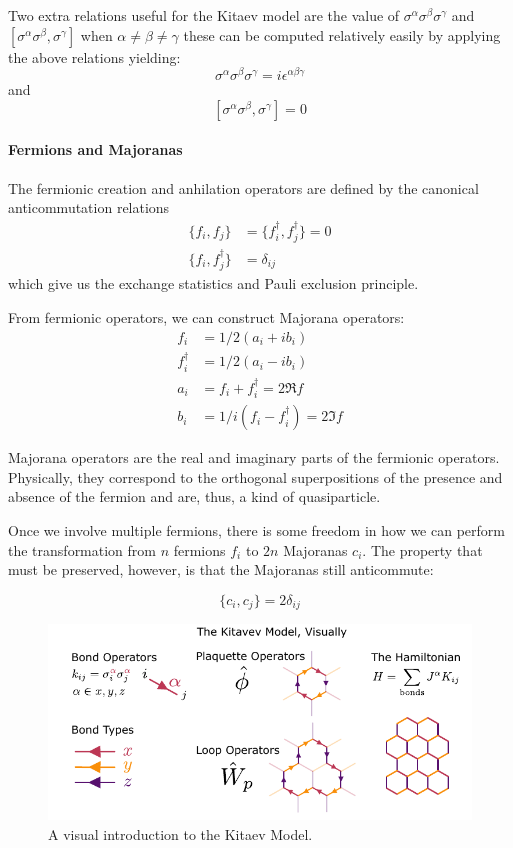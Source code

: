 Two extra relations useful for the Kitaev model are the value of \(\sigma^\alpha \sigma^\beta \sigma^\gamma\) and \([\sigma^\alpha \sigma^\beta, \sigma^\gamma]\) when \(\alpha \neq \beta \neq \gamma\) these can be computed relatively easily by applying the above relations yielding: \[\sigma^\alpha \sigma^\beta \sigma^\gamma = i \epsilon^{\alpha\beta\gamma}\] and \[[\sigma^\alpha \sigma^\beta, \sigma^\gamma] = 0\]

\hypertarget{fermions-and-majoranas}{%
\paragraph{Fermions and Majoranas}\label{fermions-and-majoranas}}

The fermionic creation and anhilation operators are defined by the canonical anticommutation relations \[\begin{aligned}
\{f_i, f_j\} &= \{f^\dagger_i, f^\dagger_j\} = 0\\
\{f_i, f^\dagger_j\} &= \delta_{ij}
\end{aligned}\] which give us the exchange statistics and Pauli exclusion principle.

From fermionic operators, we can construct Majorana operators: \[\begin{aligned}
f_i         &= 1/2 (a_i + ib_i)\\
f^\dagger_i &= 1/2(a_i - ib_i)\\
a_i         &= f_i + f^\dagger_i = 2\Re f\\
b_i         &= 1/i(f_i - f^\dagger_i) = 2\Im f 
\end{aligned}\]

Majorana operators are the real and imaginary parts of the fermionic operators. Physically, they correspond to the orthogonal superpositions of the presence and absence of the fermion and are, thus, a kind of quasiparticle.

Once we involve multiple fermions, there is some freedom in how we can perform the transformation from \(n\) fermions \(f_i\) to \(2n\) Majoranas \(c_i\). The property that must be preserved, however, is that the Majoranas still anticommute:

\[ \{c_i, c_j\} = 2\delta_{ij}\]

\begin{figure}
\hypertarget{fig:visual_kitaev_1}{%
\centering
\includegraphics[width=1\textwidth,height=\textheight]{figure_code/amk_chapter/visual_kitaev_1}
\caption[A Visual Intro to the Kitaev Model]{A visual introduction to the Kitaev
Model.}\label{fig:visual_kitaev_1}
}
\end{figure}

